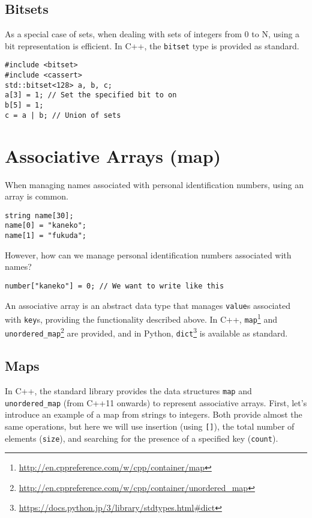 \subsection{Bitsets}
As a special case of sets, when dealing with sets of integers from 0 to N, using a bit representation is efficient. In C++, the \texttt{bitset} type is provided as standard.

\begin{cbox}
\begin{verbatim}
#include <bitset>
#include <cassert>
std::bitset<128> a, b, c;
a[3] = 1; // Set the specified bit to on
b[5] = 1;
c = a | b; // Union of sets
\end{verbatim}
\end{cbox}
\section{Associative Arrays (map)}

When managing names associated with personal identification numbers, using an array is common.

\begin{cbox}
\begin{verbatim}
string name[30];
name[0] = "kaneko";
name[1] = "fukuda";
\end{verbatim}
\end{cbox}

However, how can we manage personal identification numbers associated with names?

\begin{cbox}
\begin{verbatim}
number["kaneko"] = 0; // We want to write like this
\end{verbatim}
\end{cbox}

An associative array is an abstract data type that manages \texttt{value}s associated with \texttt{key}s, providing the functionality described above. In C++, \texttt{map}\footnote{\url{http://en.cppreference.com/w/cpp/container/map}} and \texttt{unordered\_map}\footnote{\url{http://en.cppreference.com/w/cpp/container/unordered_map}} are provided, and in Python, \texttt{dict}\footnote{\url{https://docs.python.jp/3/library/stdtypes.html\#dict}} is available as standard.

\subsection{Maps}
In C++, the standard library provides the data structures \texttt{map} and \texttt{unordered\_map} (from C++11 onwards) to represent associative arrays.
First, let's introduce an example of a map from strings to integers.
Both provide almost the same operations, but here we will use insertion (using \texttt{[]}), the total number of elements (\texttt{size}), and searching for the presence of a specified key (\texttt{count}).


